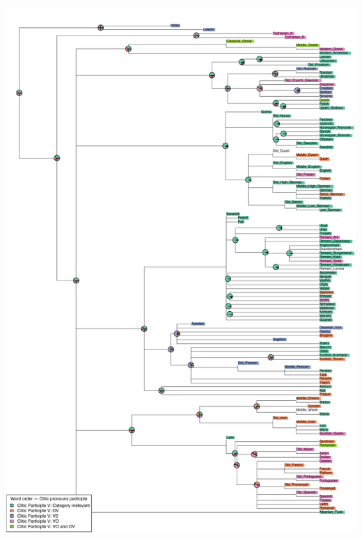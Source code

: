 \includegraphics[width=.9\linewidth]{supp-graphics/WordorderCliticpronounsparticiple2ndpositionWordorderCliticpronounsparticipleOVWordorderCliticpronounsparticipleVO.pdf}

